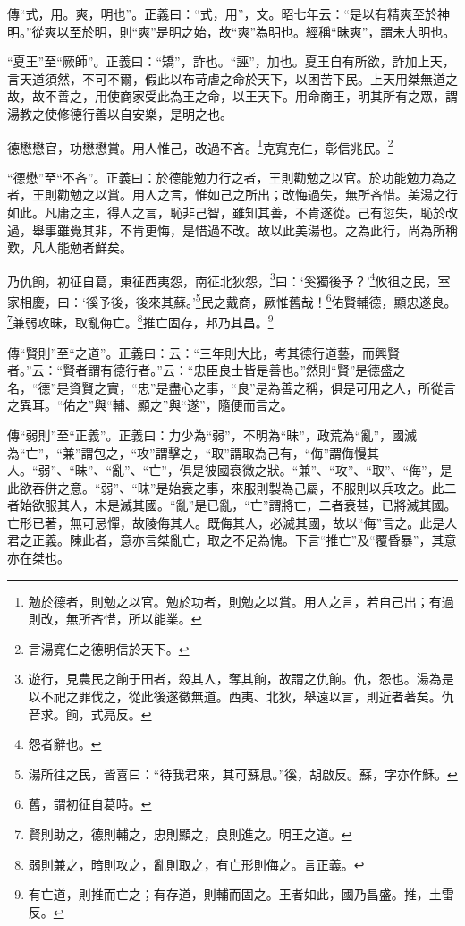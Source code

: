 {\noindent\zhuan{}\fzbyks 傳“式，用。爽，明也”。正義曰：“式，用”，文。昭七年云：“是以有精爽至於神明。”從爽以至於明，則“爽”是明之始，故“爽”為明也。經稱“昧爽”，謂未大明也。 \par}

{\noindent\shu{}\fzkt “夏王”至“厥師”。正義曰：“矯”，詐也。“誣”，加也。夏王自有所欲，詐加上天，言天道須然，不可不爾，假此以布苛虐之命於天下，以困苦下民。上天用桀無道之故，故不善之，用使商家受此為王之命，以王天下。用命商王，明其所有之眾，謂湯教之使修德行善以自安樂，是明之也。 \par}

德懋懋官，功懋懋賞。用人惟己，改過不吝。\footnote{勉於德者，則勉之以官。勉於功者，則勉之以賞。用人之言，若自己出；有過則改，無所吝惜，所以能業。}克寬克仁，彰信兆民。\footnote{言湯寬仁之德明信於天下。}

{\noindent\shu{}\fzkt “德懋”至“不吝”。正義曰：於德能勉力行之者，王則勸勉之以官。於功能勉力為之者，王則勸勉之以賞。用人之言，惟如己之所出；改悔過失，無所吝惜。美湯之行如此。凡庸之主，得人之言，恥非己智，雖知其善，不肯遂從。己有愆失，恥於改過，舉事雖覺其非，不肯更悔，是惜過不改。故以此美湯也。之為此行，尚為所稱歎，凡人能勉者鮮矣。 \par}

乃仇餉，初征自葛，東征西夷怨，南征北狄怨，\footnote{遊行，見農民之餉于田者，殺其人，奪其餉，故謂之仇餉。仇，怨也。湯為是以不祀之罪伐之，從此後遂徵無道。西夷、北狄，舉遠以言，則近者著矣。仇音求。餉，式亮反。}曰：‘奚獨後予？’\footnote{怨者辭也。}攸徂之民，室家相慶，曰：‘徯予後，後來其蘇。’\footnote{湯所往之民，皆喜曰：“待我君來，其可蘇息。”徯，胡啟反。蘇，字亦作穌。}民之戴商，厥惟舊哉！\footnote{舊，謂初征自葛時。}佑賢輔德，顯忠遂良。\footnote{賢則助之，德則輔之，忠則顯之，良則進之。明王之道。}兼弱攻昧，取亂侮亡。\footnote{弱則兼之，暗則攻之，亂則取之，有亡形則侮之。言正義。}推亡固存，邦乃其昌。\footnote{有亡道，則推而亡之；有存道，則輔而固之。王者如此，國乃昌盛。推，土雷反。}

{\noindent\zhuan{}\fzbyks 傳“賢則”至“之道”。正義曰：云：“三年則大比，考其德行道藝，而興賢者。”云：“賢者謂有德行者。”云：“忠臣良士皆是善也。”然則“賢”是德盛之名，“德”是資賢之實，“忠”是盡心之事，“良”是為善之稱，俱是可用之人，所從言之異耳。“佑之”與“輔、顯之”與“遂”，隨便而言之。 \par}

{\noindent\zhuan{}\fzbyks 傳“弱則”至“正義”。正義曰：力少為“弱”，不明為“昧”，政荒為“亂”，國滅為“亡”，“兼”謂包之，“攻”謂擊之，“取”謂取為己有，“侮”謂侮慢其人。“弱”、“昧”、“亂”、“亡”，俱是彼國衰微之狀。“兼”、“攻”、“取”、“侮”，是此欲吞併之意。“弱”、“昧”是始衰之事，來服則製為己屬，不服則以兵攻之。此二者始欲服其人，末是滅其國。“亂”是已亂，“亡”謂將亡，二者衰甚，已將滅其國。亡形已著，無可忌憚，故陵侮其人。既侮其人，必滅其國，故以“侮”言之。此是人君之正義。陳此者，意亦言桀亂亡，取之不足為愧。下言“推亡”及“覆昏暴”，其意亦在桀也。 \par}

